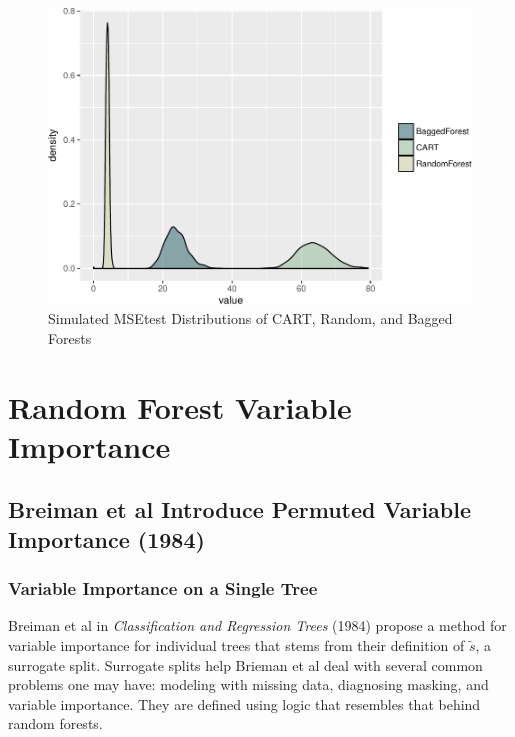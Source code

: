 \documentclass[12pt,twoside]{reedthesis}
\begin{document}
  \begin{figure}[htbp]
  \centering
  \includegraphics{Thesis_files/figure-latex/baggedvcartvforest-1.pdf}
  \caption{\label{fig:baggedvcartvforest}Simulated MSEtest Distributions of
  CART, Random, and Bagged Forests}
  \end{figure}
  
  \chapter{Random Forest Variable
  Importance}\label{random-forest-variable-importance}
  
  \section{Breiman et al Introduce Permuted Variable Importance
  (1984)}\label{breiman-et-al-introduce-permuted-variable-importance-1984}
  
  \subsection{Variable Importance on a Single
  Tree}\label{variable-importance-on-a-single-tree}
  
  Breiman et al in \emph{Classification and Regression Trees} (1984)
  propose a method for variable importance for individual trees that stems
  from their definition of \(\tilde{s}\), a surrogate split. Surrogate
  splits help Brieman et al deal with several common problems one may
  have: modeling with missing data, diagnosing masking, and variable
  importance. They are defined using logic that resembles that behind
  random forests.
  
\end{document}
